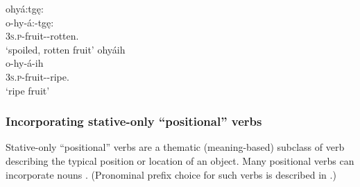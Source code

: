 \ex ohyá:tgę:\\
\gll o-hy-á:-tgę:\\
 \textsc{3s.p}-fruit-{\joinerA}-rotten.{\stative}\\
\glt `spoiled, rotten fruit'
\ex ohyáih\\
\gll o-hy-á-ih\\
 \textsc{3s.p}-fruit-{\joinerA}-ripe.{\stative}\\
\glt `ripe fruit'
\z
\z


\subsubsection*{Incorporating stative-only “positional”  verbs} \label{ch:Incorporating positional (stative-only) verbs}
Stative-only “positional” verbs are a thematic (meaning-based) subclass of verb describing the typical position or location of an object. Many positional verbs can incorporate nouns . (Pronominal prefix choice for such verbs is described in .)

